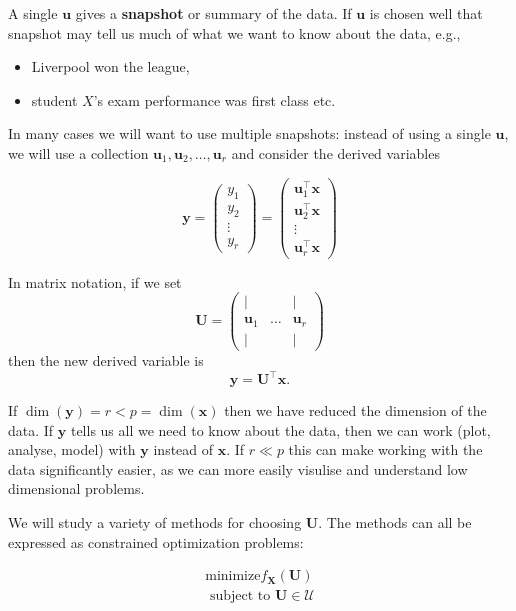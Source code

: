 \documentclass[
]{book}
\providecommand{\tightlist}{%
  \setlength{\itemsep}{0pt}\setlength{\parskip}{0pt}}
\theoremstyle{definition}
\theoremstyle{definition}
\theoremstyle{definition}
\theoremstyle{definition}
\theoremstyle{remark}
\begin{document}
A single \(\mathbf u\) gives a \textbf{snapshot} or summary of the data. If \(\mathbf u\) is chosen well that snapshot may tell us much of what we want to know about the data, e.g.,

\begin{itemize}
\tightlist
\item
  Liverpool won the league,
\item
  student \(X\)'s exam performance was first class etc.
\end{itemize}

In many cases we will want to use multiple snapshots: instead of using a single \(\mathbf u\), we will use a collection \(\mathbf u_1, \mathbf u_2, \ldots, \mathbf u_r\) and consider the derived variables

\[\mathbf y= \begin{pmatrix} y_1\\y_2 \\ \vdots \\ y_r\end{pmatrix} = \begin{pmatrix}
\mathbf u_1^\top \mathbf x\\  \mathbf u_2^\top \mathbf x\\\vdots\\  \mathbf u_r^\top \mathbf x\end{pmatrix}\]

In matrix notation, if we set
\[\mathbf U= \begin{pmatrix} 
|&&|\\
\mathbf u_1 & \ldots & \mathbf u_r\\
|&&|\end{pmatrix}\]
then the new derived variable is
\[\mathbf y= \mathbf U^\top \mathbf x.\]

If \(\dim(\mathbf y)=r<p=\dim(\mathbf x)\) then we have reduced the dimension of the data. If \(\mathbf y\) tells us all we need to know about the data, then we can work (plot, analyse, model) with \(\mathbf y\) instead of \(\mathbf x\). If \(r\ll p\) this can make working with the data significantly easier, as we can more easily visulise and understand low dimensional problems.

We will study a variety of methods for choosing \(\mathbf U\). The methods can all be expressed as constrained optimization problems:

\begin{align}
\mbox{minimize} f_{\mathbf X}(\mathbf U) \label{eq:dimredopt} \\
\mbox{ subject to } \mathbf U\in \mathcal{U} 
\end{align}
\end{document}
